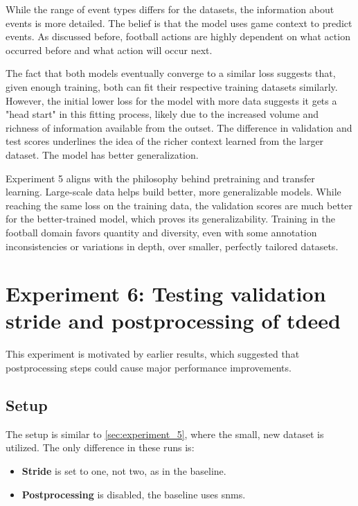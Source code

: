 While the range of event types differs for the datasets, the information about events is more detailed. The belief is that the model uses game context to predict events. As discussed  before, football actions are highly dependent on what action occurred before and what action will occur next. 



The fact that both models eventually converge to a similar loss suggests that, given enough training, both can fit their respective training datasets similarly. However, the initial lower loss for the model with more data suggests it gets a "head start" in this fitting process, likely due to the increased volume and richness of information available from the outset. The difference in validation and test scores underlines the idea of the richer context learned from the larger dataset. The model has better generalization. 


Experiment 5 aligns with the philosophy behind pretraining and transfer learning. Large-scale data helps build better, more generalizable models. While reaching the same loss on the training data, the validation scores are much better for the better-trained model, which proves its generalizability. Training in the football domain favors quantity and diversity, even with some annotation inconsistencies or variations in depth, over smaller, perfectly tailored datasets.


\section{Experiment 6: Testing validation stride and postprocessing of \acrshort{tdeed}}
\label{sec:experiment_6}

This experiment is motivated by earlier results, which suggested that postprocessing steps could cause major performance improvements. 

\subsection{Setup}
\label{ssec:ex6_setup}
The setup is similar to \cref{sec:experiment_5}, where the small, new dataset is utilized. The only difference in these runs is:

\begin{itemize}
    \item \textbf{Stride} is set to one, not two, as in the baseline.
    \item \textbf{Postprocessing} is disabled, the baseline uses \acrlong{snms}.
\end{itemize}

